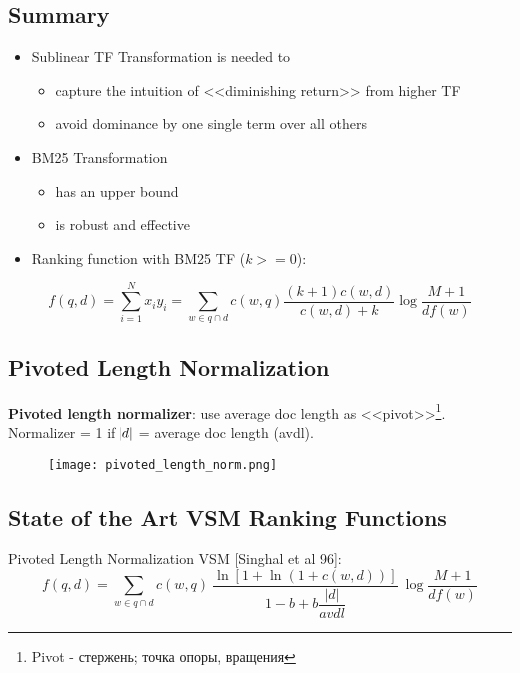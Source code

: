 \subsection{Summary}
\begin{itemize}
\item Sublinear TF Transformation is needed to
\begin{itemize}
\item capture the intuition of <<diminishing return>> from higher TF 
\item avoid dominance by one single term over all others
\end{itemize}

\item BM25 Transformation 
\begin{itemize}
\item has an upper bound
\item is robust and effective
\end{itemize}

\item Ranking function with BM25 TF ($k >= 0$):
\end{itemize}

\begin{equation*}
f(q, d) = \sum_{i=1}^N x_i y_i = \sum_{w \in q \cap d} c(w, q) \frac{(k+1) c(w, d)}{c(w, d) + k} \log \frac{M+1}{df(w)}
\end{equation*}


\subsection{Pivoted Length Normalization}

\textbf{Pivoted length normalizer}: use average doc length as <<pivot>>\footnote{Pivot - стержень; точка опоры, вращения}. Normalizer = 1 if $\abs{d}$ = average doc length (avdl).

\begin{figure}[H]
    \centering
    \texttt{[image: pivoted\_length\_norm.png]}
\end{figure}


\subsection{State of the Art VSM Ranking Functions}

Pivoted Length Normalization VSM [Singhal et al 96]:
\begin{equation*}
f(q, d) = \sum_{w \in q \cap d} c(w, q) \: \frac{\ln[1+\ln(1+c(w, d))]}{1-b+b\dfrac{|d|}{avdl}} \: \log\frac{M+1}{df(w)}
\end{equation*}


